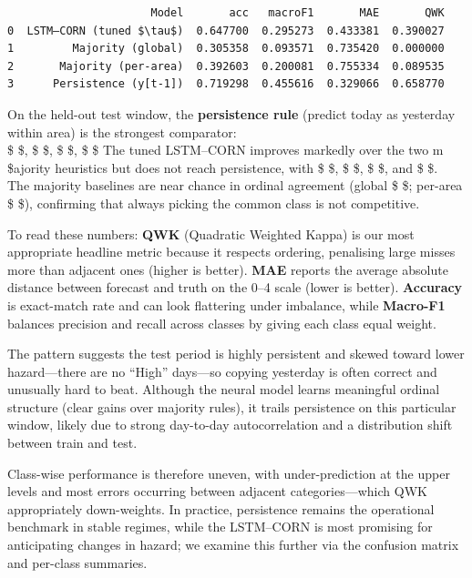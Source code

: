 \documentclass[
  letterpaper,
  DIV=11,
  numbers=noendperiod]{scrartcl}
\begin{document}
\begin{verbatim}
                      Model       acc   macroF1       MAE       QWK
0  LSTM–CORN (tuned $\tau$)  0.647700  0.295273  0.433381  0.390027
1         Majority (global)  0.305358  0.093571  0.735420  0.000000
2       Majority (per-area)  0.392603  0.200081  0.755334  0.089535
3      Persistence (y[t-1])  0.719298  0.455616  0.329066  0.658770
\end{verbatim}

On the held-out test window, the \textbf{persistence rule} (predict
today as yesterday within area) is the strongest comparator:\\
\$   \$, \$   \$, \$
  \$, \$  \$ The
tuned LSTM--CORN improves markedly over the two m \$ajority heuristics
but does not reach persistence, with \$   \$, \$
  \$, \$   \$, and \$
  \$.\\
The majority baselines are near chance in ordinal agreement (global \$
  \$; per-area \$   \$),
confirming that always picking the common class is not competitive.

To read these numbers: \textbf{QWK} (Quadratic Weighted Kappa) is our
most appropriate headline metric because it respects ordering,
penalising large misses more than adjacent ones (higher is better).
\textbf{MAE} reports the average absolute distance between forecast and
truth on the 0--4 scale (lower is better). \textbf{Accuracy} is
exact-match rate and can look flattering under imbalance, while
\textbf{Macro-F1} balances precision and recall across classes by giving
each class equal weight.

The pattern suggests the test period is highly persistent and skewed
toward lower hazard---there are no ``High'' days---so copying yesterday
is often correct and unusually hard to beat. Although the neural model
learns meaningful ordinal structure (clear gains over majority rules),
it trails persistence on this particular window, likely due to strong
day-to-day autocorrelation and a distribution shift between train and
test.

Class-wise performance is therefore uneven, with under-prediction at the
upper levels and most errors occurring between adjacent
categories---which QWK appropriately down-weights. In practice,
persistence remains the operational benchmark in stable regimes, while
the LSTM--CORN is most promising for anticipating changes in hazard; we
examine this further via the confusion matrix and per-class summaries.
\end{document}
